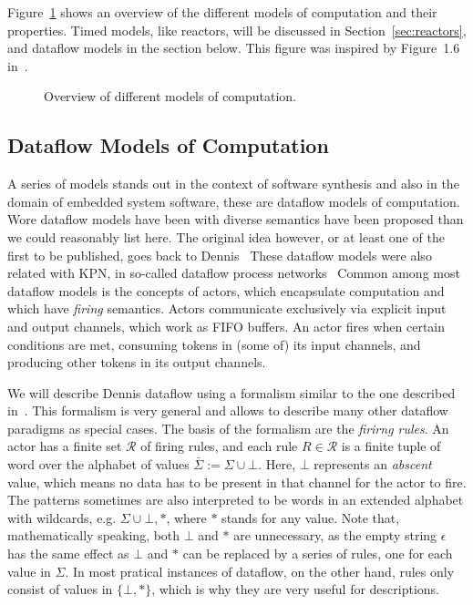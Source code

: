 Figure~\ref{fig:dataflow_mocs} shows an overview of the different models of computation and their properties.
Timed models, like reactors, will be discussed in Section~\ref{sec:reactors}, and dataflow models in the section below.
This figure was inspired by Figure~1.6 in~\cite{Ptolemaeus:14:SystemDesign}.

\begin{figure}[h]
	\centering
   \resizebox{0.95\textwidth}{!}{}
	\caption{Overview of different models of computation.}
	\label{fig:dataflow_mocs}
\end{figure}


\subsection{Dataflow Models of Computation}

A series of models stands out in the context of software synthesis and also in the domain of embedded system software, these are dataflow models of computation.
Wore dataflow models have been with diverse semantics have been proposed than we could reasonably list here.
The original idea however, or at least one of the first to be published, goes back to Dennis~\cite{dennis1974first,dennis1986data}
These dataflow models were also related with \ac{KPN}, in so-called dataflow process networks~\cite{lee1995dataflow,lee_matsikoudis_semantics}
Common among most dataflow models is the concepts of actors, which encapsulate computation and which have \emph{firing} semantics.
Actors communicate exclusively via explicit input and output channels, which work as \acs{FIFO} buffers.
An actor fires when certain conditions are met, consuming tokens in (some of) its input channels, and producing other tokens in its output channels.

We will describe Dennis dataflow using a formalism similar to the one described in~\cite{Parks:M95/105,lee_matsikoudis_semantics}.
This formalism is very general and allows to describe many other dataflow paradigms as special cases.
The basis of the formalism are the \emph{firirng rules}.
An actor has a finite set $\mathcal{R}$ of firing rules, and each rule $R \in \mathcal{R}$ is a finite tuple of word over the alphabet of values $\bar \Sigma := \Sigma \cup {\bot}$.
Here, $\bot$ represents an \emph{abscent} value, which means no data has to be present in that channel for the actor to fire.
The patterns sometimes are also interpreted to be words in an extended alphabet with wildcards, e.g. $\Sigma \cup {\bot,*}$, where $*$ stands for any value.
Note that, mathematically speaking, both $\bot$ and $*$ are unnecessary, as the empty string $\epsilon$ has the same effect as $\bot$ and $*$ can be replaced by a series of rules, one for each value in $\Sigma$.
In most pratical instances of dataflow, on the other hand, rules only consist of values in $\{\bot,*\}$, which is why they are very useful for descriptions.

